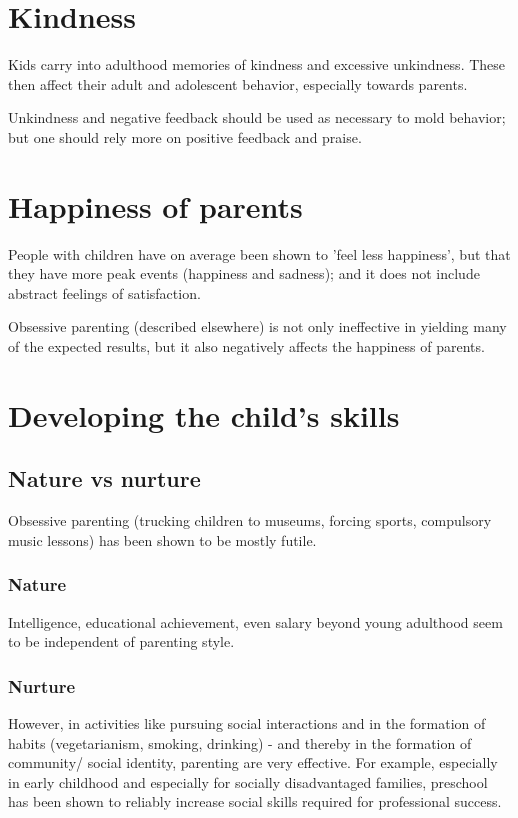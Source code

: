 \documentclass[oneside, article]{memoir}
\begin{document}
\section{Kindness}
Kids carry into adulthood memories of kindness and excessive unkindness. These then affect their adult and adolescent behavior, especially towards parents.

Unkindness and negative feedback should be used as necessary to mold behavior; but one should rely more on positive feedback and praise.

\section{Happiness of parents}
People with children have on average been shown to 'feel less happiness', but that they have more peak events (happiness and sadness); and it does not include abstract feelings of satisfaction.

Obsessive parenting (described elsewhere) is not only ineffective in yielding many of the expected results, but it also negatively affects the happiness of parents.

\section{Developing the child's skills}
\subsection{Nature vs nurture}
Obsessive parenting (trucking children to museums, forcing sports, compulsory music lessons) has been shown to be mostly futile.

\subsubsection{Nature}
Intelligence, educational achievement, even salary beyond young adulthood seem to be independent of parenting style.

\subsubsection{Nurture}
However, in activities like pursuing social interactions and in the formation of habits (vegetarianism, smoking, drinking) - and thereby in the formation of community/ social identity, parenting are very effective. For example, especially in early childhood and especially for socially disadvantaged families, preschool has been shown to reliably increase social skills required for professional success.
\end{document}
